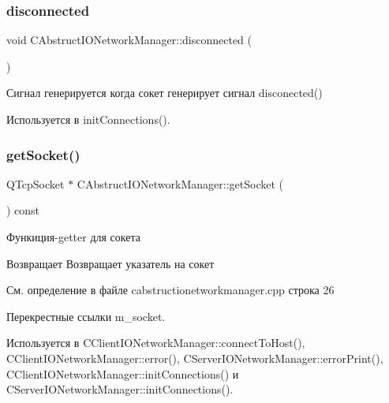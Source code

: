 \subsubsection{\texorpdfstring{disconnected}{disconnected}}
{\footnotesize\ttfamily void C\+Abstruct\+I\+O\+Network\+Manager\+::disconnected (\begin{DoxyParamCaption}{ }\end{DoxyParamCaption})\hspace{0.3cm}{\ttfamily [signal]}}



Сигнал генерируется когда сокет генерирует сигнал disconected() 



Используется в init\+Connections().

\hypertarget{class_c_abstruct_i_o_network_manager_a118a2c8254c149614cba51c42147c709}{}\label{class_c_abstruct_i_o_network_manager_a118a2c8254c149614cba51c42147c709} 
\subsubsection{\texorpdfstring{get\+Socket()}{getSocket()}}
{\footnotesize\ttfamily Q\+Tcp\+Socket $\ast$ C\+Abstruct\+I\+O\+Network\+Manager\+::get\+Socket (\begin{DoxyParamCaption}{ }\end{DoxyParamCaption}) const}



Функиция-\/getter для сокета 

\begin{DoxyReturn}{Возвращает}
Возвращает указатель на сокет 
\end{DoxyReturn}


См. определение в файле cabstructionetworkmanager.\+cpp строка 26



Перекрестные ссылки m\+\_\+socket.



Используется в C\+Client\+I\+O\+Network\+Manager\+::connect\+To\+Host(), C\+Client\+I\+O\+Network\+Manager\+::error(), C\+Server\+I\+O\+Network\+Manager\+::error\+Print(), C\+Client\+I\+O\+Network\+Manager\+::init\+Connections() и C\+Server\+I\+O\+Network\+Manager\+::init\+Connections().


